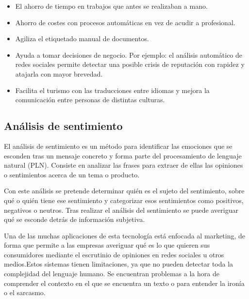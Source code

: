 \begin{itemize}
	\item El ahorro de tiempo en trabajos que antes se realizaban a mano.
	\item Ahorro de costes con procesos automáticas en vez de acudir a profesional.
	\item Agiliza el etiquetado manual de documentos.
	\item Ayuda a tomar decisiones de negocio. Por ejemplo: el análisis automático de redes sociales permite detectar una posible crisis de reputación con rapidez y atajarla con mayor brevedad.
	\item Facilita el turismo con las traducciones entre idiomas y mejora la comunicación entre personas de distintas culturas.
\end{itemize}

\subsection{Análisis de sentimiento} \label{sentiment}

El análisis de sentimiento \citep{sentimientoanalisis} es un método para identificar las emociones que se esconden tras un mensaje concreto y forma parte del procesamiento de lenguaje natural (PLN). Consiste en analizar las frases para extraer de ellas las opiniones o sentimientos acerca de un tema o producto.

Con este análisis \citep{sentanalisis} se pretende determinar quién es el sujeto del sentimiento, sobre qué o quién tiene ese sentimiento y categorizar esos sentimientos como positivos, negativos o neutros. Tras realizar el análisis del sentimiento se puede averiguar qué se esconde detrás de información subjetiva.

Una de las muchas aplicaciones de esta tecnología está enfocada al marketing, de forma que permite a las empresas averiguar qué es lo que quieren sus consumidores mediante el escrutinio de opiniones en redes sociales u otros medios.Estos sistemas tienen limitaciones, ya que no pueden detectar toda la complejidad del lenguaje humano. Se encuentran problemas a la hora de comprender el contexto en el que se encuentra un texto o para entender la ironía o el sarcasmo.

